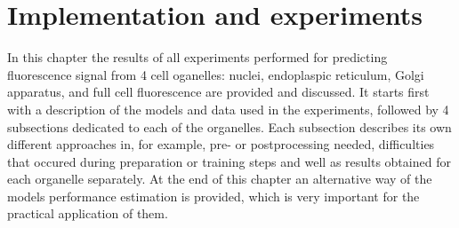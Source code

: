 \section{Implementation and experiments}
In this chapter the results of all experiments performed for predicting fluorescence signal from 4 cell oganelles: nuclei, endoplaspic reticulum, Golgi apparatus, and full cell fluorescence are provided and discussed. It starts first with a description of the models and data used in the experiments, followed by 4 subsections dedicated to each of the organelles. Each subsection describes its own different approaches in, for example, pre- or postprocessing needed, difficulties that occured during preparation or training steps and well as results obtained for each organelle separately. At the end of this chapter an alternative way of the models performance estimation is provided, which is very important for the practical application of them.

    
    \pagebreak
    
    \pagebreak
    
    \pagebreak
    
    \pagebreak
    